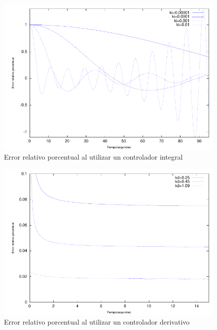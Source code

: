 \documentclass{sig-alternate}
\begin{document}
\begin{figure}[hp]
\label{errorMIntegral}
\centering
\includegraphics[scale=0.8]{graficos/errorMIntegral}
\caption{Error relativo porcentual al utilizar un controlador integral}
\end{figure}

\begin{figure}[hp]
\label{errorPorcentualMDerivativo}
\centering
\includegraphics[scale=0.8]{graficos/errorPorcentualMDerivativo}
\caption{Error relativo porcentual al utilizar un controlador derivativo}
\end{figure}
\end{document}
